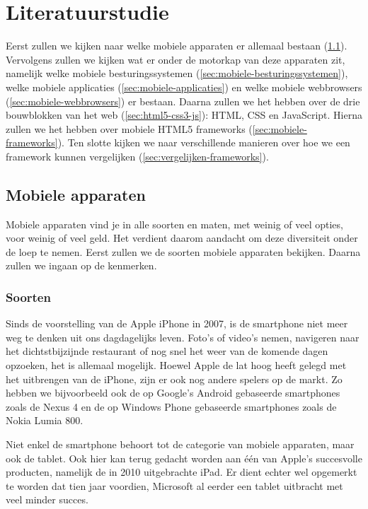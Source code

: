 \chapter{Literatuurstudie}
\label{hoofdstuk:2}
Eerst zullen we kijken naar welke mobiele apparaten er allemaal bestaan (\ref{sec:mobiele-apparaten}). Vervolgens zullen we kijken wat er onder de motorkap van deze apparaten zit, namelijk welke mobiele besturingssystemen (\ref{sec:mobiele-besturingssystemen}), welke mobiele applicaties (\ref{sec:mobiele-applicaties}) en welke mobiele webbrowsers (\ref{sec:mobiele-webbrowsers}) er bestaan. Daarna zullen we het hebben over de drie bouwblokken van het web (\ref{sec:html5-css3-js}):  HTML,  CSS en JavaScript. Hierna zullen we het hebben over mobiele HTML5 frameworks (\ref{sec:mobiele-frameworks}).  Ten slotte kijken we naar verschillende manieren over hoe we een framework kunnen vergelijken (\ref{sec:vergelijken-frameworks}).


\section{Mobiele apparaten}
\label{sec:mobiele-apparaten}
Mobiele apparaten vind je in alle soorten en maten, met weinig of veel opties, voor weinig of veel geld. Het verdient daarom aandacht om deze diversiteit onder de loep te nemen. Eerst zullen we de soorten mobiele apparaten bekijken. Daarna zullen we ingaan op de kenmerken.

\subsection{Soorten}
Sinds de voorstelling van de Apple iPhone in 2007, is de smartphone niet meer weg te denken uit ons dagdagelijks leven. Foto's of video's nemen, navigeren naar het dichtstbijzijnde restaurant of nog snel het weer van de komende dagen opzoeken, het is allemaal mogelijk. Hoewel Apple de lat hoog heeft gelegd met het uitbrengen van de iPhone, zijn er ook nog andere spelers op de markt. Zo hebben we bijvoorbeeld ook de op Google's Android gebaseerde smartphones zoals de Nexus 4 en de op Windows Phone gebaseerde smartphones zoals de Nokia Lumia 800.

Niet enkel de smartphone behoort tot de categorie van mobiele apparaten, maar ook de tablet. Ook hier kan terug gedacht worden aan één van Apple's succesvolle producten, namelijk de in 2010 uitgebrachte iPad. Er dient echter wel opgemerkt te worden dat tien jaar voordien, Microsoft al eerder een tablet uitbracht met veel minder succes.

